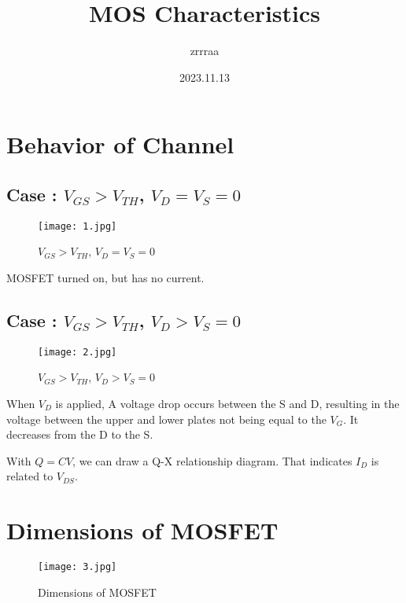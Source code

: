 \documentclass[fontset=windows]{article}
\title{\heiti\zihao{2} MOS Characteristics \uppercase\expandafter{\romannumeral1}}
\author{\songti zrrraa}
\date{2023.11.13}
\begin{document}
\maketitle
\thispagestyle{empty}

\section*{Behavior of Channel}

\subsection*{Case \uppercase\expandafter{}: $V_{GS}>V_{TH}$, $V_D=V_S=0$}

\begin{figure}[htbp]
    \centering
    \texttt{[image: 1.jpg]}
    \captionsetup{labelformat=empty}
    \caption{$V_{GS}>V_{TH}$, $V_D=V_S=0$}
    \label{1}
\end{figure}

MOSFET turned on, but has no current.

\subsection*{Case \uppercase\expandafter{}: $V_{GS}>V_{TH}$, $V_D>V_S=0$}

\begin{figure}[htbp]
    \centering
    \texttt{[image: 2.jpg]}
    \captionsetup{labelformat=empty}
    \caption{$V_{GS}>V_{TH}$, $V_D>V_S=0$}
    \label{2}
\end{figure}

When $V_D$ is applied, A voltage drop occurs between the S and D,
resulting in the voltage between the upper and lower plates not being equal to the $V_G$.
It decreases from the D to the S.

With $Q=CV$, we can draw a Q-X relationship diagram. That indicates $I_D$ is related to $V_{DS}$.

\section*{Dimensions of MOSFET}

\begin{figure}[htbp]
    \centering
    \texttt{[image: 3.jpg]}
    \captionsetup{labelformat=empty}
    \caption{Dimensions of MOSFET}
    \label{3}
\end{figure}
\end{document}
